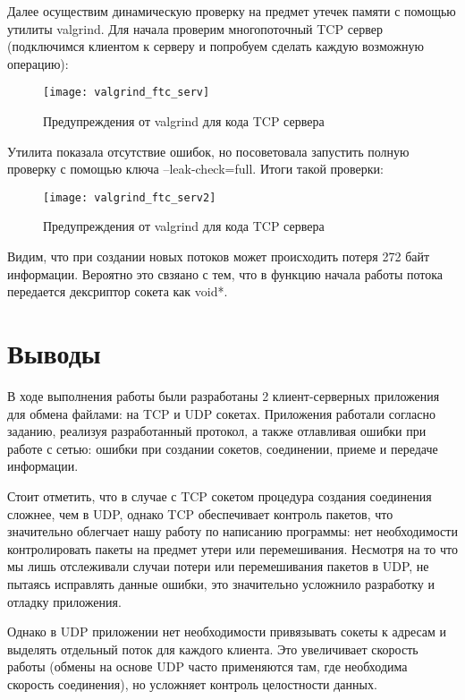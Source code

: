 Далее осуществим динамическую проверку на предмет утечек памяти с помощью утилиты valgrind. Для начала проверим многопоточный TCP сервер (подключимся клиентом к серверу и попробуем сделать каждую возможную операцию):
\begin{figure}[H]
	\begin{center}
		\texttt{[image: valgrind\_ftc\_serv]}
		\caption{Предупреждения от valgrind для кода TCP сервера} 
		\label{pic:valgr1} %
	\end{center}
\end{figure}
Утилита показала отсутствие ошибок, но посоветовала запустить полную проверку с помощью ключа --leak-check=full. 
Итоги такой проверки:
\begin{figure}[H]
	\begin{center}
		\texttt{[image: valgrind\_ftc\_serv2]}
		\caption{Предупреждения от valgrind для кода TCP сервера} 
		\label{pic:valgr2} %
	\end{center}
\end{figure}
Видим, что при создании новых потоков может происходить потеря 272 байт информации. Вероятно это свзяано с тем, что в функцию начала работы потока передается дексриптор сокета как void*.

\section{Выводы}
В ходе выполнения работы были разработаны 2 клиент-серверных приложения для обмена файлами: на TCP и UDP сокетах. Приложения работали согласно заданию, реализуя разработанный протокол, а также отлавливая ошибки при работе с сетью: ошибки при создании сокетов, соединении, приеме и передаче информации. 

Стоит отметить, что в случае с TCP сокетом процедура создания соединения сложнее, чем в UDP, однако TCP обеспечивает контроль пакетов, что значительно облегчает нашу работу по написанию программы: нет необходимости контролировать пакеты на предмет утери или перемешивания.
Несмотря на то что мы лишь отслеживали случаи потери или перемешивания пакетов в UDP, не пытаясь исправлять данные ошибки, это значительно усложнило разработку и отладку приложения.

Однако в UDP приложении нет необходимости привязывать сокеты к адресам и выделять отдельный поток для каждого клиента. Это увеличивает скорость работы (обмены на основе UDP часто применяются там, где необходима скорость соединения), но усложняет контроль целостности данных. 


